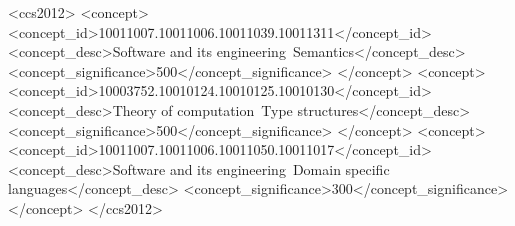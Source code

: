 \documentclass[sigplan,screen]{acmart}
\begin{document}
\begin{CCSXML}
<ccs2012>
<concept>
<concept_id>10011007.10011006.10011039.10011311</concept_id>
<concept_desc>Software and its engineering~Semantics</concept_desc>
<concept_significance>500</concept_significance>
</concept>
<concept>
<concept_id>10003752.10010124.10010125.10010130</concept_id>
<concept_desc>Theory of computation~Type structures</concept_desc>
<concept_significance>500</concept_significance>
</concept>
<concept>
<concept_id>10011007.10011006.10011050.10011017</concept_id>
<concept_desc>Software and its engineering~Domain specific languages</concept_desc>
<concept_significance>300</concept_significance>
</concept>
</ccs2012>
\end{CCSXML}


\maketitle              %

\thispagestyle{empty}







%
%
%



\end{document}
